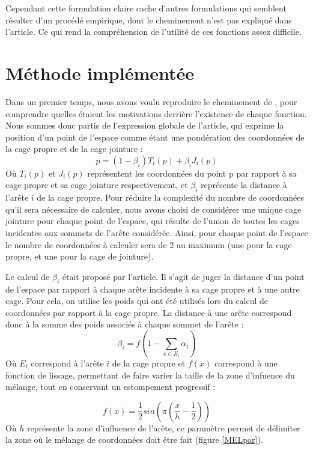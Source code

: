 Cependant cette formulation claire cache d'autres formulations qui
semblent résulter d'un procédé empirique, dont le cheminement n'est
pas expliqué dans l'article. Ce qui rend la compréhension de l'utilité
de ces fonctions assez difficile.

\section{Méthode implémentée}
Dans un premier temps, nous avons voulu reproduire le cheminement de
\cite{GPCP13}, pour comprendre quelles étaient les motivations
derrière l'existence de chaque fonction. Nous sommes donc partis de
l'expression globale de l'article, qui exprime la position d'un point
de l'espace comme étant une pondération des coordonnées de la cage
propre et de la cage jointure :
\begin{equation}
  p = (1 - \beta_i) T_i(p)  + \beta_i J_i(p) 
  \label{MELgen}
\end{equation}
Où $T_i(p)$ et $J_i(p)$ représentent les coordonnées du point p par
rapport à sa cage propre et sa cage jointure respectivement, et
$\beta_i$ représente la distance à l'arête $i$ de la cage propre. Pour
réduire la complexité du nombre de coordonnées qu'il sera nécessaire
de calculer, nous avons choisi de considérer une unique cage jointure
pour chaque point de l'espace, qui résulte de l'union de toutes les
cages incidentes aux sommets de l'arête considérée. Ainsi, pour chaque
point de l'espace le nombre de coordonnées à calculer sera de 2 au
maximum (une pour la cage propre, et une pour la cage de jointure).

Le calcul de $\beta_i$ était proposé par l'article. Il s'agit de juger
la distance d'un point de l'espace par rapport à chaque arête
incidente à sa cage propre et à une autre cage. Pour cela, on utilise
les poids qui ont été utilisés lors du calcul de coordonnées par
rapport à la cage propre. La distance à une arête correspond donc à la
somme des poids associés à chaque sommet de l'arête :
\begin{equation}
  \beta_{i} = f(1 - \sum_{v \in E_i} \alpha_i)
\end{equation}
Où $E_i$ correspond à l'arête $i$ de la cage propre et $f(x)$
correspond à une fonction de lissage, permettant de faire varier la
taille de la zone d'infuence du mélange, tout en conservant un
estompement progressif :

\begin{equation}
  f(x) = \frac{1}{2} sin(\pi(\frac{x}{h}-\frac{1}{2}))
\end{equation}
Où $h$ représente la zone d'influence de l'arête, ce paramètre permet
de délimiter la zone où le mélange de coordonnées doit être fait
(figure \ref{MELpar}).

